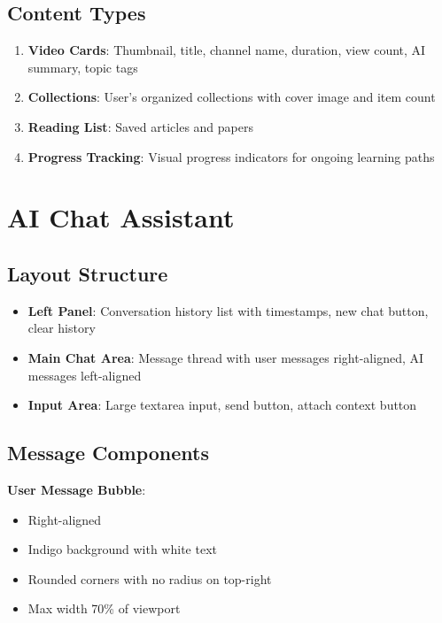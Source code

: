 \documentclass{report}
\begin{document}
\subsection{Content Types}

\begin{enumerate}
    \item \textbf{Video Cards}: Thumbnail, title, channel name, duration, view count, AI summary, topic tags
    \item \textbf{Collections}: User's organized collections with cover image and item count
    \item \textbf{Reading List}: Saved articles and papers
    \item \textbf{Progress Tracking}: Visual progress indicators for ongoing learning paths
\end{enumerate}

\section{AI Chat Assistant}

\subsection{Layout Structure}

\begin{itemize}
    \item \textbf{Left Panel}: Conversation history list with timestamps, new chat button, clear history
    \item \textbf{Main Chat Area}: Message thread with user messages right-aligned, AI messages left-aligned
    \item \textbf{Input Area}: Large textarea input, send button, attach context button
\end{itemize}

\subsection{Message Components}

\textbf{User Message Bubble}:
\begin{itemize}
    \item Right-aligned
    \item Indigo background with white text
    \item Rounded corners with no radius on top-right
    \item Max width 70\% of viewport
\end{itemize}
\end{document}
